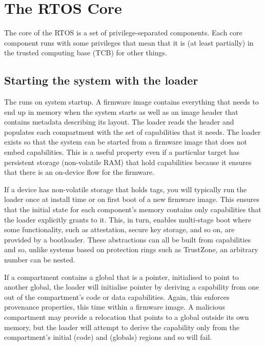 \chapter{The RTOS Core}

The core of the RTOS is a set of privilege-separated components.
Each core component runs with some privileges that mean that it is (at least partially) in the trusted computing base (TCB) for other things.

\section{Starting the system with the loader}

The  runs on system startup.
A firmware image contains everything that needs to end up in memory when the system starts as well as an image header that contains metadata describing its layout.
The loader reads the header and populates each compartment with the set of capabilities that it needs.
The loader exists so that the system can be started from a firmware image that does not embed capabilities.
This is a useful property even if a particular target has persistent storage (non-volatile RAM) that  hold capabilities because it ensures that there is an on-device  flow for the firmware.

If a device has non-volatile storage that holds tags, you will typically run the loader once at install time or on first boot of a new firmware image.
This ensures that the initial state for each component's memory contains only capabilities that the loader explicitly grants to it.
This, in turn, enables multi-stage boot where some functionality, such as attestation, secure key storage, and so on, are provided by a bootloader.
These abstractions can all be built from capabilities and so, unlike systems based on protection rings such as TrustZone, an arbitrary number can be nested.

If a compartment contains a global that is a pointer, initialised to point to another global, the loader will initialise pointer by deriving a capability from one out of the compartment's code or data capabilities.
Again, this enforces provenance properties, this time within a firmware image.
A malicious compartment may provide a relocation that points to a global outside its own memory, but the loader will attempt to derive the capability only from the compartment's initial  (code) and  (globals) regions and so will fail.


